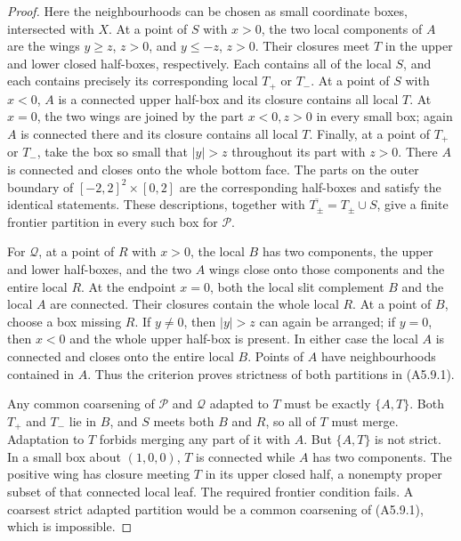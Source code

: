 \begin{proof}
Here the neighbourhoods can be chosen as small coordinate boxes,
intersected with $X$.  At a point of $S$ with $x>0$, the two local
components of $A$ are the wings $y\geq z$, $z>0$, and $y\leq-z$, $z>0$.  Their closures meet $T$ in the upper and
lower closed half-boxes, respectively.  Each contains all of the
local $S$, and each contains precisely its corresponding local
$T_+$ or $T_-$.  At a point of $S$ with $x<0$, $A$ is a connected
upper half-box and its closure contains all local $T$.  At $x=0$,
the two wings are joined by the part $x<0,z>0$ in every small box;
again $A$ is connected there and its closure contains all local
$T$.  Finally, at a point of $T_+$ or $T_-$, take the box so small
that $|y|>z$ throughout its part with $z>0$.  There $A$ is
connected and closes onto the whole bottom face.  The parts on the
outer boundary of $[-2,2]^2\times[0,2]$ are the corresponding
half-boxes and satisfy the identical statements.  These descriptions,
together with $\overline{T_\pm}=T_\pm\cup S$, give a finite
frontier partition in every such box for $\mathcal P$.

For $\mathcal Q$, at a point of $R$ with $x>0$, the local $B$ has
two components, the upper and lower half-boxes, and the two $A$
wings close onto those components and the entire local $R$.
At the endpoint $x=0$, both the local slit complement $B$ and the
local $A$ are connected.  Their closures contain the whole local
$R$.  At a point of $B$, choose a box missing $R$.  If $y\ne0$,
then $|y|>z$ can again be arranged; if $y=0$, then $x<0$ and the
whole upper half-box is present.  In either case the local $A$ is
connected and closes onto the entire local $B$.  Points of $A$
have neighbourhoods contained in $A$.  Thus the criterion proves
strictness of both partitions in (A5.9.1).

Any common coarsening of $\mathcal P$ and $\mathcal Q$ adapted
to $T$ must be exactly $\{A,T\}$.  Both $T_+$ and $T_-$ lie in
$B$, and $S$ meets both $B$ and $R$, so all of $T$ must merge.
Adaptation to $T$ forbids merging any part of it with $A$.
But $\{A,T\}$ is not strict.  In a small box about $(1,0,0)$,
$T$ is connected while $A$ has two components.  The positive wing
has closure meeting $T$ in its upper closed half, a nonempty proper
subset of that connected local leaf.  The required frontier
condition fails.  A coarsest strict adapted partition would be a
common coarsening of (A5.9.1), which is impossible.


\end{proof}
